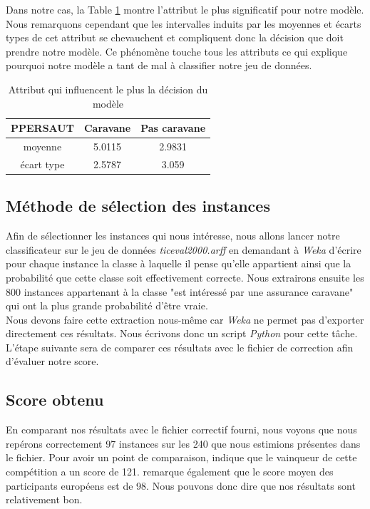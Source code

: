 \documentclass[11pt,a4paper]{article}
\begin{document}
				Dans notre cas, la Table \ref{tab:cap_desc} montre l'attribut le plus significatif pour notre modèle.	Nous remarquons cependant que les intervalles induits par les moyennes et écarts types de cet attribut se chevauchent et compliquent donc la décision que doit prendre notre modèle. Ce phénomène touche tous les attributs ce qui explique pourquoi notre modèle a tant de mal à classifier notre jeu de données. 

								
				\begin{table}[h]
					\centering
					\caption{Attribut qui influencent le plus la décision du modèle}
					\label{tab:cap_desc}
					\begin{tabular}{c|c c}
						PPERSAUT & Caravane & Pas caravane \\
						\hline
						moyenne & 5.0115 & 2.9831 \\
						écart type & 2.5787 & 3.059\\
					\end{tabular}
				\end{table}
				
			\subsection{Méthode de sélection des instances}
			
				Afin de sélectionner les instances qui nous intéresse, nous allons lancer notre classificateur sur le jeu de données \textit{ticeval2000.arff} en demandant à \textit{Weka} d'écrire pour chaque instance la classe à laquelle il pense qu'elle appartient ainsi que la probabilité que cette classe soit effectivement correcte. Nous extrairons ensuite les 800 instances appartenant à la classe "est intéressé par une assurance caravane" qui ont la plus grande probabilité d'être vraie.\\
				
				Nous devons faire cette extraction nous-même car \textit{Weka} ne permet pas d'exporter directement ces résultats. Nous écrivons donc un script \textit{Python} pour cette tâche. L'étape suivante sera de comparer ces résultats avec le fichier de correction afin d'évaluer notre score.
				
			\subsection{Score obtenu}
			
				En comparant nos résultats avec le fichier correctif fourni, nous voyons que nous repérons correctement 97 instances sur les 240 que nous estimions présentes dans le fichier. Pour avoir un point de comparaison, \cite[Putten]{CoIlChallenge} indique que le vainqueur de cette compétition a un score de 121. \cite[Putten]{CoIlChallenge} remarque également que le score moyen des participants européens est de 98. Nous pouvons donc dire que nos résultats sont relativement bon.
				
\end{document}
